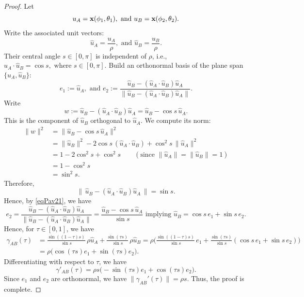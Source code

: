 \documentclass[12pt, reqno]{amsart}
\theoremstyle{plain}
\theoremstyle{definition}
\newcommand{\set}[1]{\{#1\}}%
\renewcommand{\gg}{\gamma}%
\newcommand{\gq}{\theta}
\newcommand{\gt}{\tau}
\newcommand{\tbf}{\textbf}%
\newcommand{\te}{\text}%
\begin{document}
\begin{proof}
Let \[u_A=\tbf x(\phi_1, \gq_1), \te{ and } u_B=\tbf x(\phi_2, \gq_2).\]
 Write the associated unit vectors: 
\[\hat u_A=\frac {u_A} \rho, \te{ and } \hat u_B=\frac {u_B}\rho.\]
Their central angle $s \in [0, \pi]$ is independent of $\rho$, i.e., $\hat u_A \cdot \hat u_B = \cos s, \text{ where } s \in [0,\pi]$. Build an orthonormal basis of the plane span$\set{\hat u_A, \hat u_B}$: 
\begin{equation} \label{eqPav21} e_1:=\hat u_A, \te{ and } e_2:=\frac{\hat u_B-(\hat u_A\cdot \hat u_B) \hat u_A}{\|\hat u_B-(\hat u_A\cdot \hat u_B) \hat u_A\|}.\end{equation} 
Write
\[
w := \hat u_B - (\hat u_A \cdot \hat u_B)\hat u_A = \hat u_B - \cos s\,\hat u_A.
\]
This is the component of \(\hat u_B\) orthogonal to \(\hat u_A\).
We compute its norm:
\[
\begin{aligned}
\|w\|^2 
&= \|\hat u_B - \cos s\,\hat u_A\|^2 \\[4pt]
&= \|\hat u_B\|^2 - 2\cos s\,(\hat u_A \cdot \hat u_B) + \cos^2 s\,\|\hat u_A\|^2 \\[4pt]
&= 1 - 2\cos^2s + \cos^2s \qquad  (\text{since }\|\hat u_A\|=\|\hat u_B\|=1) \\[4pt]
&= 1 - \cos^2s \\[4pt]
&= \sin^2 s.
\end{aligned}
\]
Therefore, 
\[
\|\,\hat u_B - (\hat u_A \cdot \hat u_B)\hat u_A\,\| = \sin s.
\]
Hence, by \eqref{eqPav21}, we have 
\[
e_2 = \frac{\hat u_B - (\hat u_A \cdot \hat u_B)\hat u_A}{\|\hat u_B - (\hat u_A \cdot \hat u_B)\hat u_A\|}
     = \frac{\hat u_B - \cos s\,\hat u_A}{\sin s} \te{ implying } \hat u_B=\cos s \, e_1+\sin s \,e_2.
\]
Hence, for $\gt \in [0, 1]$, we have 
\begin{align*}
\gamma_{AB}(\tau)
&= \frac{\sin((1-\tau)s)}{\sin s}\,\rho \hat u_A
+ \frac{\sin(\tau s)}{\sin s}\,\rho \hat u_B =\rho\Big(\frac{\sin((1-\tau)s)}{\sin s}\, e_1
+ \frac{\sin(\tau s)}{\sin s}(\cos s \, e_1+\sin s \,e_2)\Big) \\
&=\rho\Big(\cos(\gt s) e_1+ \sin (\gt s) e_2\Big).
\end{align*}
Differentiating with respect to $\gt$, we have 
\[\gamma'_{AB}(\tau)=\rho s\Big(-\sin(\gt s) e_1+ \cos (\gt s) e_2\Big).\]
Since $e_1$ and $e_2$ are orthonormal, we have $\|\gg_{AB}'(\gt)\|=\rho s$. Thus, the proof is complete. 
 \end{proof}
\end{document}

